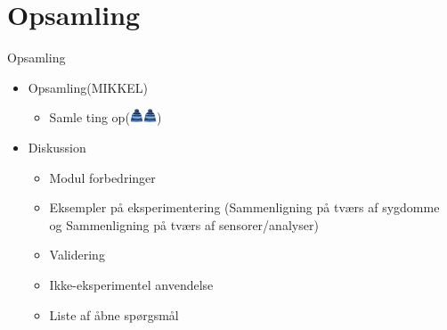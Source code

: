 \section{Opsamling}
\begin{frame}{Opsamling}
\newcommand{\hue}{\includegraphics[width=0.4cm]{hue}}
\begin{itemize}
\item Opsamling(MIKKEL)
\begin{itemize}
\item Samle ting op(\hue{}\hue{})
\end{itemize}
\item Diskussion
\begin{itemize}
\item Modul forbedringer
\item Eksempler på eksperimentering (Sammenligning på tværs af sygdomme og Sammenligning på tværs af sensorer/analyser)
\item Validering
\item Ikke-eksperimentel anvendelse
\item Liste af åbne spørgsmål
\end{itemize}
\end{itemize}
\end{frame}
